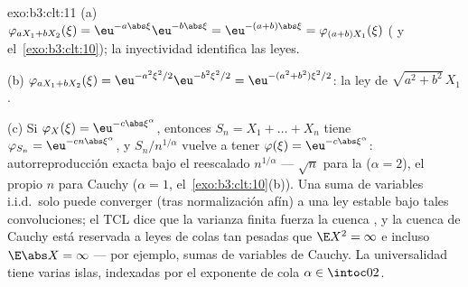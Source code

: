 \begin{solution}{exo:b3:clt:11}
(a) $\varphi_{aX_1 + bX_2}(\xi) =
\eu^{-a\abs\xi}\eu^{-b\abs\xi} = \eu^{-(a+b)\abs\xi} =
\varphi_{(a+b)X_1}(\xi)$
( y
el~\cref{exo:b3:clt:10}); la inyectividad identifica las leyes.

(b) $\varphi_{aX_1+bX_2}(\xi) = \eu^{-a^2\xi^2/2}
\eu^{-b^2\xi^2/2} = \eu^{-(a^2+b^2)\xi^2/2}$: la ley de
$\sqrt{a^2+b^2}\,X_1$.

(c) Si $\varphi_X(\xi) = \eu^{-c\abs\xi^\alpha}$, entonces
$S_n = X_1 + \dots + X_n$ tiene $\varphi_{S_n} =
\eu^{-cn\abs\xi^\alpha}$, y $S_n/n^{1/\alpha}$ vuelve a tener
$\varphi(\xi) = \eu^{-c\abs\xi^\alpha}$: autorreproducción exacta bajo
el reescalado $n^{1/\alpha}$ --- $\sqrt n$ para la
 ($\alpha = 2$), el propio
$n$ para Cauchy ($\alpha = 1$, el~\cref{exo:b3:clt:10}(b)). Una suma de
variables i.i.d.\ solo puede converger (tras normalización afín) a una
ley estable bajo tales convoluciones; el TCL dice que la varianza finita
fuerza la cuenca , y la
cuenca de Cauchy está reservada a leyes de colas tan pesadas que
$\E X^2 = \infty$ e incluso $\E\abs
X = \infty$ --- por ejemplo, sumas de variables de Cauchy. La
universalidad tiene varias islas, indexadas por el exponente de cola
$\alpha \in \intoc02$.
\end{solution}

